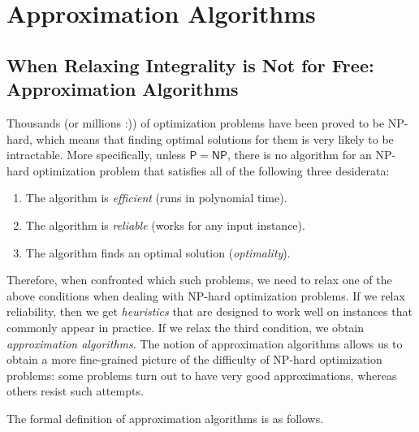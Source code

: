 % 
\chapter{Approximation Algorithms}
\section{When Relaxing Integrality is Not for Free: Approximation Algorithms}

Thousands (or millions :)) of optimization problems have been proved to be NP-hard, which means
that finding optimal solutions for them is very likely to be intractable. More specifically, unless
$\mathsf{P}=\mathsf{NP}$, there is no algorithm for an NP-hard optimization problem that satisfies
all of the following three desiderata:
\begin{enumerate}
  \item The algorithm is \emph{efficient} (runs in polynomial time).
  \item The algorithm is \emph{reliable} (works for any input instance).
  \item The algorithm finds an optimal solution (\emph{optimality}).
\end{enumerate}
Therefore, when confronted which such problems, we need to relax one of the above conditions when
dealing with NP-hard optimization problems. If we relax reliability, then we get \emph{heuristics}
that are designed to work well on instances that commonly appear in practice. If we relax the third
condition, we obtain \emph{approximation algorithms}. The notion of approximation algorithms allows
us to obtain a more fine-grained picture of the difficulty of NP-hard optimization problems: some
problems turn out to have very good approximations, whereas others resist such attempts.

The formal definition of approximation algorithms is as follows.


